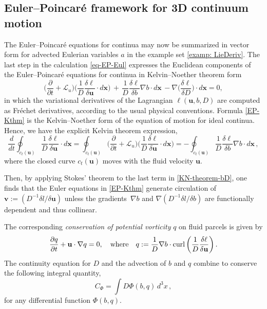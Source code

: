 \documentclass[11pt, oneside]{article}   	%
\numberwithin{equation}{section}
\theoremstyle{plain}
\theoremstyle{definition}
\theoremstyle{remark}
\newcommand{\<}{\langle}
\renewcommand{\>}{\rangle}
\begin{document}
\subsection{Euler--Poincar\'e framework for 3D continuum motion}
The Euler--Poincar\'e equations for continua may
now be summarized in vector form for advected Eulerian variables $a$ in the
example set \ref{examp: LieDeriv}. The last step in the calculation \eqref{eq-EP-Eul} 
expresses the Euclidean components of the Euler--Poincar\'e equations for continua
in Kelvin--Noether theorem form   
\begin{equation}
\Big(\frac{\partial }{\partial t} +  \mathcal{L}_u\Big)
\Big(\frac{1}{D}\frac{\delta \ell}{\delta
\mathbf{u}}\cdot d\mathbf{x}\Big)
\,+\,\frac{1}{D}\frac{\delta \ell}{\delta b}\nabla b \cdot d\mathbf{x}
\,-\nabla\Big(\frac{\delta \ell}{\delta D}\Big)\cdot d\mathbf{x}
 = 0,
\label{EP-Kthm}
\end{equation}
in which the variational derivatives of the Lagrangian $\ell(\mathbf{u}, b,D)$ are
computed as Fr\'echet derivatives, according to the usual physical conventions. 
Formula \eqref{EP-Kthm} is the Kelvin--Noether form of the equation of motion for ideal continua.
Hence, we have the explicit Kelvin theorem expression,  
\begin{equation} \label{KN-theorem-bD}
\frac{d}{dt}\oint_{{c}_t(\mathbf{u})} \frac{1}{D}\frac{\delta \ell}{\delta \mathbf{u}}\cdot d\mathbf{x}
=
\oint_{{c}_t (\mathbf{u})} \Big(\frac{\partial }{\partial t} +  \mathcal{L}_u\Big) \Big(\frac{1}{D}\frac{\delta \ell}{\delta \mathbf{u}}\cdot d\mathbf{x}\Big)
= 
-\oint_{{c}_t(\mathbf{u})}
\frac{1}{D}\frac{\delta \ell}{\delta b}\nabla b \cdot d\mathbf{x}\,,
\end{equation}
where the closed curve ${c}_t(\mathbf{u})$ moves with the fluid velocity
$\mathbf{u}$. 

Then, by applying Stokes' theorem to the last term in \eqref{KN-theorem-bD}, one finds that the Euler equations in \eqref{EP-Kthm} generate circulation of
$\mathbf{v}:=(D^{-1}\delta{l}/\delta\mathbf{u})$
unless the gradients~$\nabla b$ and $\nabla(D^{-1}\delta{l}/\delta{b})$ are functionally dependent and thus collinear. 

The corresponding \emph{conservation of potential vorticity} $q$ on fluid
parcels is given by
\begin{equation} \label{pv-cons-EP}
\frac{\partial{q}}{\partial{t}}+\mathbf{u}\cdot\nabla{q} = 0,
\quad \hbox{where}\quad
q:=\frac{1}{D}\nabla{b}\cdot\mathrm{curl}
\left(\frac{1}{D}\frac{\delta \ell}{\delta \mathbf{u}}\right).
\end{equation}
The continuity equation for $D$ and the advection of $b$ and $q$ combine to conserve the following integral quantity, 
\begin{equation} \label{pv-Casimir}
C_\Phi = \int D \Phi(b,q)\,d^3x
\,,\end{equation}
for any differential function $\Phi(b,q)$.
\end{document}

